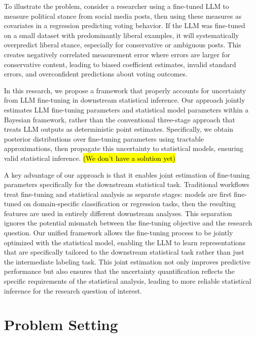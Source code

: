 \documentclass[11pt]{article}
\begin{document}
To illustrate the problem, consider a researcher using a fine-tuned LLM to measure political stance 
from social media posts, then using these measures as covariates in a regression predicting voting behavior. 
If the LLM was fine-tuned on a small dataset with predominantly liberal examples, 
it will systematically overpredict liberal stance, 
especially for conservative or ambiguous posts. 
This creates negatively correlated measurement error where errors are 
larger for conservative content, leading to biased coefficient estimates, 
invalid standard errors, and overconfident predictions about voting outcomes.

In this research, we propose a framework that properly accounts for uncertainty 
from LLM fine-tuning in downstream statistical inference. 
Our approach jointly estimates LLM fine-tuning parameters and statistical model parameters 
within a Bayesian framework, rather than the conventional three-stage approach that treats LLM outputs 
as deterministic point estimates. 
Specifically, we obtain posterior distributions over fine-tuning parameters 
using tractable approximations, then propagate this uncertainty to statistical models,
ensuring valid statistical inference. \hl{(We don't have a solution yet)}

A key advantage of our approach is that it enables joint estimation of fine-tuning parameters 
specifically for the downstream statistical task. 
Traditional workflows treat fine-tuning and statistical analysis as separate stages: 
models are first fine-tuned on domain-specific classification or regression tasks, 
then the resulting features are used in entirely different downstream analyses. 
This separation ignores the potential mismatch between the fine-tuning objective 
and the research question. 
Our unified framework allows the fine-tuning process to be jointly optimized with the statistical model, 
enabling the LLM to learn representations that are specifically tailored to the downstream statistical task 
rather than just the intermediate labeling task. 
This joint estimation not only improves predictive performance but also ensures that the uncertainty quantification 
reflects the specific requirements of the statistical analysis, 
leading to more reliable statistical inference for the research question of interest.

\section{Problem Setting}
\end{document}
